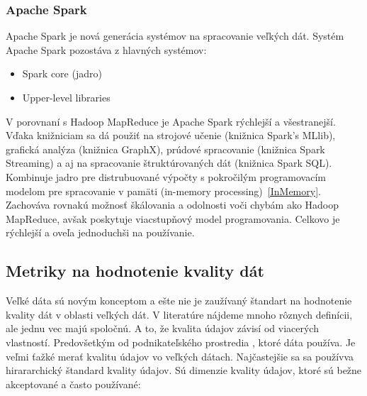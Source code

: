 \documentclass[10pt,slovak,a4paper]{article}
\begin{document}
\subsubsection {Apache Spark}

Apache Spark je nová generácia systémov na spracovanie veľkých dát. Systém Apache Spark pozostáva z hlavných systémov:
\begin{itemize}
\item Spark core (jadro)
\item Upper-level libraries
\end{itemize}
V porovnaní s Hadoop MapReduce je Apache Spark rýchlejší a všestranejší. Vďaka knižniciam sa dá použiť na strojové učenie (knižnica Spark’s MLlib), grafická analýza (knižnica GraphX), prúdové spracovanie (knižnica Spark Streaming) a aj na spracovanie štruktúrovaných dát (knižnica Spark SQL). Kombinuje jadro pre distrubuované výpočty s pokročilým programovacím modelom pre spracovanie v pamäti (in-memory processing)~\ref{InMemory}. Zachováva rovnakú možnosť škálovania a odolnosti voči chybám ako Hadoop MapReduce, avšak poskytuje viacstupňový model programovania. Celkovo je rýchlejší a oveľa jednoduchši na používanie.~\cite{Apache}

\subsection {Metriky na hodnotenie kvality dát} \label {Metriky}
Veľké dáta sú novým konceptom a ešte nie je zaužívaný štandart na hodnotenie kvality dát v oblasti veľkých dát. V literatúre nájdeme mnoho rôznych definícii, ale jednu vec majú spoločnú. A to, že kvalita údajov závisí od viacerých vlastností. Predovšetkým od podnikateľského prostredia , ktoré dáta používa. Je veľmi ťažké merať kvalitu údajov vo veľkých dátach. Najčastejšie sa sa používva hirararchický štandard kvality údajov. Sú dimenzie kvality údajov, ktoré sú bežne akceptované a často používané:
\end{document}
